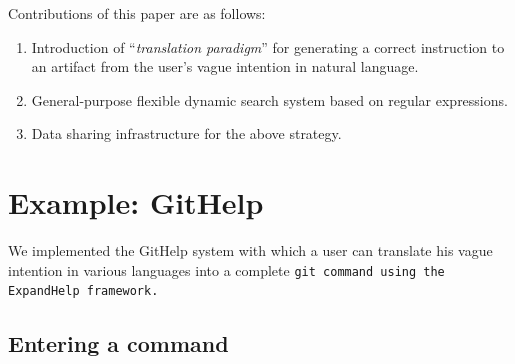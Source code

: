 \documentclass{sigchi}
\def\GH{\textsf{GitHelp}}
\def\EH{\textsf{ExpandHelp}}
\begin{document}

Contributions of this paper are as follows:

\begin{enumerate}
\item Introduction of ``\textit{translation paradigm}'' for
  generating a correct instruction to an artifact from
  the user's vague intention in natural language.
\item General-purpose flexible dynamic search system based on regular expressions.
\item Data sharing infrastructure for the above strategy.
\end{enumerate}

\section{Example: GitHelp}

We implemented the {\GH} system
with which a user can translate his vague intention in various languages
into a complete \tt{git} command
using the {\EH} framework.

\subsection{Entering a command}
\end{document}
